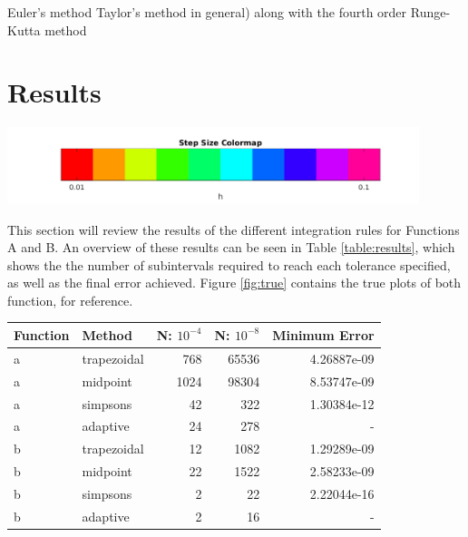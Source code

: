 \documentclass{article}
\begin{document}
Euler's method Taylor's method in general) along with the fourth order Runge-Kutta method 



\newpage
\section{Results}
\label{sec:results}


\begin{center}
  \includegraphics[width=0.9\textwidth]{../output/colormap.png}
  \label{fig:h_val_colormap}
\end{center}

This section will review the results of the different integration rules for Functions A and B. An overview of these results can be seen in Table \ref{table:results}, which shows the the number of subintervals required to reach each tolerance specified, as well as the final error achieved. Figure \ref{fig:true} contains the true plots of both function, for reference.

\bgroup
\footnotesize
\def\arraystretch{1.5}
\begin{center}
	\centering
	\begin{tabular}{l|l|r|r|r}
	\textbf{Function} & \textbf{Method} & \textbf{N: $10^{-4}$} & \textbf{N: $10^{-8}$} &\textbf{Minimum Error} \\
	\hline
	a & trapezoidal & 768  & 65536 & 4.26887e-09 \\
    a & midpoint    & 1024 & 98304 & 8.53747e-09 \\
    a & simpsons    & 42   & 322   & 1.30384e-12 \\
    a & adaptive    & 24   & 278   & -           \\
    b & trapezoidal & 12   & 1082  & 1.29289e-09 \\
    b & midpoint    & 22   & 1522  & 2.58233e-09 \\
    b & simpsons    & 2    & 22    & 2.22044e-16 \\
    b & adaptive    & 2    & 16    & -
	\end{tabular}
	\label{table:results}
\end{center}
\egroup
\end{document}
